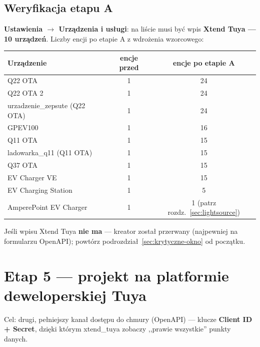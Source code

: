 \documentclass[11pt,a4paper]{article}
\begin{document}
\subsection{Weryfikacja etapu A}

\textbf{Ustawienia $\to$ Urządzenia i usługi}: na liście musi być wpis \textbf{Xtend Tuya --- 10 urządzeń}. Liczby encji po etapie A z wdrożenia wzorcowego:

\begin{center}
\begin{tabular}{lcc}
\toprule
\textbf{Urządzenie} & \textbf{encje przed} & \textbf{encje po etapie A}\\
\midrule
Q22 OTA & 1 & 24\\
Q22 OTA 2 & 1 & 24\\
urzadzenie\_zepsute (Q22 OTA) & 1 & 24\\
GPEV100 & 1 & 16\\
Q11 OTA & 1 & 15\\
ladowarka\_q11 (Q11 OTA) & 1 & 15\\
Q37 OTA & 1 & 15\\
EV Charger VE & 1 & 15\\
EV Charging Station & 1 & 5\\
AmperePoint EV Charger & 1 & 1 (patrz rozdz.~\ref{sec:lightsource})\\
\bottomrule
\end{tabular}
\end{center}

Jeśli wpisu Xtend Tuya \textbf{nie ma} --- kreator został przerwany (najpewniej na formularzu OpenAPI); powtórz podrozdział~\ref{sec:krytyczne-okno} od początku.

\section{Etap 5 --- projekt na platformie deweloperskiej Tuya}
\label{sec:etap5}

Cel: drugi, pełniejszy kanał dostępu do chmury (OpenAPI) --- klucze \textbf{Client ID + Secret}, dzięki którym xtend\_tuya zobaczy ,,prawie wszystkie'' punkty danych.
\end{document}
